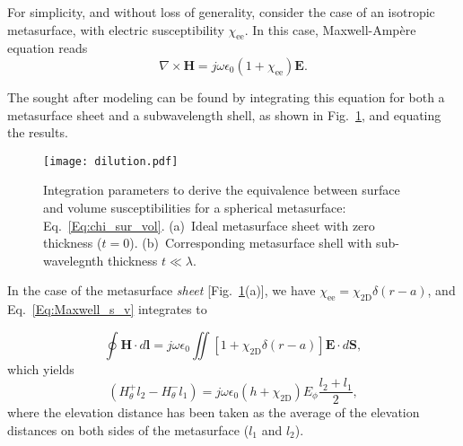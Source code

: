 \documentclass[journal,transaction]{IEEEtran}
\newcommand{\figref}{Fig.~\ref}
\newcommand{\ve}[1]{\mathbf{#1}}
\begin{document}
For simplicity, and without loss of generality, consider the case of an isotropic metasurface, with electric susceptibility $\chi_\text{ee}$. In this case, Maxwell-Amp\`{e}re equation reads
%
\begin{equation}\label{Eq:Maxwell_s_v}
  \nabla \times \ve{H}=j\omega\epsilon_0(1+\chi_\text{ee})\ve{E}.
\end{equation}

The sought after modeling can be found by integrating this equation for both a metasurface sheet and a subwavelength shell, as shown in \figref{FIG:dilution}, and equating the results.

\begin{figure}[!h]
    \centering
         \texttt{[image: dilution.pdf]}{
        }
        \caption{Integration parameters to derive the equivalence between surface and volume susceptibilities for a spherical metasurface: Eq.~\eqref{Eq:chi_sur_vol}. (a)~Ideal metasurface sheet with zero thickness ($t=0$). (b)~Corresponding metasurface shell with sub-wavelegnth thickness $t\ll\lambda$.}
   \label{FIG:dilution}
\end{figure}

In the case of the metasurface \emph{sheet} [\figref{FIG:dilution}(a)], we have $\chi_\text{ee}=\chi_\text{2D}\delta(r-a)$, and Eq.~\eqref{Eq:Maxwell_s_v} integrates to

\begin{equation}\label{Eq:Maxwellintegration1}
\oint \ve{H}\cdot d\ve{l}=j\omega\epsilon_0\iint [1+\chi_\text{2D}\delta (r-a)]\ve{E}\cdot d\ve{S},
\end{equation}
%
which yields
%
\begin{equation}\label{Eq:surface}
(H_\theta^+l_2-H_\theta^-l_1)=j\omega\epsilon_0(h+\chi_\text{2D})E_\phi\frac{l_2+l_1}{2},
\end{equation}
%
where the elevation distance has been taken as the average of the elevation distances on both sides of the metasurface ($l_1$ and $l_2$).
\end{document}

